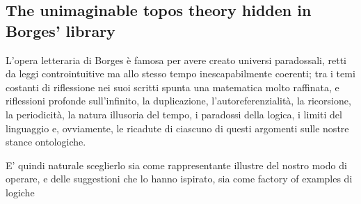 \subsection{The unimaginable topos theory hidden in Borges' library}
L'opera letteraria di Borges è famosa per avere creato universi paradossali, retti da leggi controintuitive ma allo stesso tempo inescapabilmente coerenti; tra i temi costanti di riflessione nei suoi scritti spunta una matematica molto raffinata, e riflessioni profonde sull'infinito, la duplicazione, l'autoreferenzialità, la ricorsione, la periodicità, la natura illusoria del tempo, i paradossi della logica, i limiti del linguaggio e, ovviamente, le ricadute di ciascuno di questi argomenti sulle nostre stance ontologiche.

E' quindi naturale sceglierlo sia come rappresentante illustre del nostro modo di operare, e delle suggestioni che lo hanno ispirato, sia come factory of examples di logiche 

